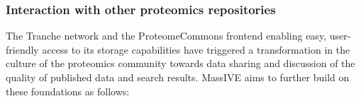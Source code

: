 \documentclass[arial,11pt]{article}
\begin{document}


\subsubsection{Interaction with other proteomics repositories}

The Tranche network and the ProteomeCommons frontend enabling easy, user-friendly access to its storage capabilities have triggered a transformation in the culture of the proteomics community towards data sharing and discussion of the quality of published data and search results. MassIVE aims to further build on these foundations as follows:
\end{document}
